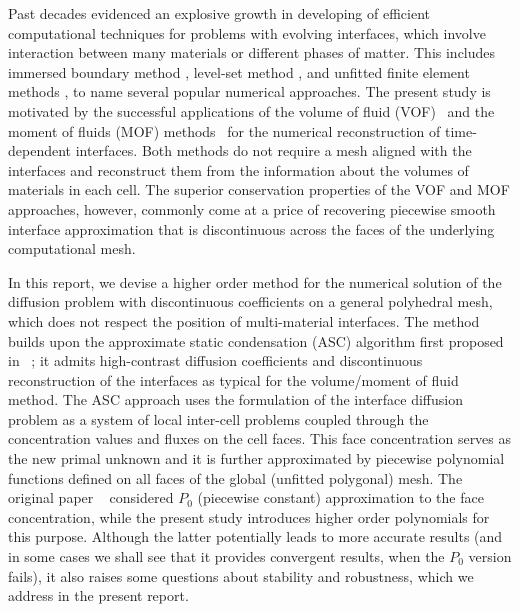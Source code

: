 \documentclass[12pt]{article}
\begin{document}
 Past decades evidenced an 	explosive growth in developing of efficient computational techniques for problems with evolving interfaces, which involve interaction between many materials or different phases of matter. This includes immersed boundary method \cite{peskin2002immersed}, level-set method \cite{sethian1999level}, and unfitted finite element methods \cite{belytschko2009review,burman2015cutfem}, to name several popular numerical approaches.
 The present study is motivated by the successful applications of the volume of fluid (VOF)~\cite{hirt1981volume} and the moment of fluids (MOF) methods~\cite{ahn2009adaptive} for the numerical  reconstruction of time-dependent interfaces. Both  methods do not require a mesh aligned with the  interfaces and reconstruct them from the information about the volumes of materials in each cell.
 The superior conservation properties of the  VOF and MOF approaches, however, commonly come at a price of recovering piecewise smooth interface approximation that is  discontinuous across the faces of the underlying computational mesh.

In this report, we devise  a higher order method for the numerical solution of the diffusion problem with discontinuous  coefficients on a general polyhedral mesh, which does not respect the position of multi-material interfaces.  The method builds upon the approximate static condensation (ASC) algorithm first  proposed in ~\cite{kikinzon2017approximate}; it admits high-contrast diffusion coefficients and discontinuous reconstruction of the interfaces as typical for the volume/moment of fluid method. The ASC approach uses the formulation of the interface diffusion problem as a system of local inter-cell problems  coupled through the concentration values and fluxes on the cell faces. This face concentration serves as the new primal unknown and it is further approximated by piecewise  polynomial functions defined on all faces of the global (unfitted polygonal) mesh. The original paper ~\cite{kikinzon2017approximate} considered $P_0$ (piecewise constant) approximation to the face concentration, while the present study introduces higher order polynomials for this purpose.
Although the latter potentially leads to more accurate results  (and in some cases we shall see that it provides convergent results, when the $P_0$ version fails), it also raises some questions about stability and robustness, which we address in the present report.
\end{document}
